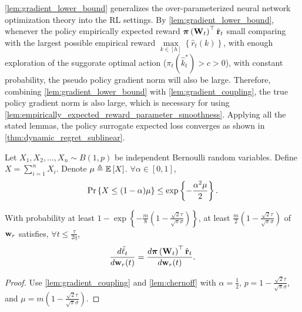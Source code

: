 \cref{lem:gradient_lower_bound} generalizes the over-parameterized neural network optimization theory into the RL settings. By \cref{lem:gradient_lower_bound}, whenever the policy empirically expected reward ${\boldsymbol{\pi}}\left( {\mathbf{W}}_t \right)^\top \hat{{\mathbf{r}}}_t$ small comparing with the largest possible empirical reward $\max\limits_{k \in \left[h\right]}\left\{ \hat{r}_{t}(k) \right\}$, with enough exploration of the suggorate optimal action ($\pi_{t}(\hat{k}_t^*) > c > 0$), with constant probability, the pseudo policy gradient norm will also be large. Therefore, combining \cref{lem:gradient_lower_bound} with \cref{lem:gradient_coupling}, the true policy gradient norm is also large, which is necessary for using \cref{lem:empirically_expected_reward_parameter_smoothness}. Applying all the stated lemmas, the policy surrogate expected loss converges as shown in \cref{thm:dynamic_regret_sublinear}.

\begin{lem}[Chernoff]
\label{lem:chernoff}
    Let $X_1, X_2, \dots, X_n \sim B(1, p)$ be independent Bernoulli random variables. Define $X = \sum\limits_{i=1}^{n}{ X_i  }$. Denote $\mu \triangleq {\mathbb{E}}\left[ X \right]$. $\forall \alpha \in [0,1]$,
\begin{equation*}
    \operatorname*{Pr}\left\{ X \le (1 - \alpha) \mu \right\} \le \exp\left\{ - \frac{\alpha^2 \mu}{2} \right\}.
\end{equation*}
\end{lem}

\begin{lem}
\label{lem:gradient_coupling_in_total}
With probability at least $1 - \exp\left\{ - \frac{m}{8} \left( 1 - \frac{\sqrt{2}\tau}{\sqrt{\pi}\sigma} \right) \right\}$, at least $\frac{m}{2}\left( 1 - \frac{\sqrt{2}\tau}{\sqrt{\pi}\sigma} \right) $ of ${\mathbf{w}}_r$ satisfies, $\forall t \le \frac{\tau}{ 2 \eta }$,
\begin{equation*}
	\frac{d\tilde{\ell}_t}{d {\mathbf{w}}_r(t)} = \frac{d {\boldsymbol{\pi}}\left({\mathbf{W}}_t\right)^\top \hat{{\mathbf{r}}}_t}{d {\mathbf{w}}_r(t)}.
\end{equation*}
\end{lem}
\begin{proof}
Use \cref{lem:gradient_coupling} and \cref{lem:chernoff} with $\alpha = \frac{1}{2}$, $p = 1 - \frac{\sqrt{2}\tau}{\sqrt{\pi}\sigma}$, and $\mu = m \left( 1 - \frac{\sqrt{2}\tau}{\sqrt{\pi}\sigma} \right)$.
\end{proof}